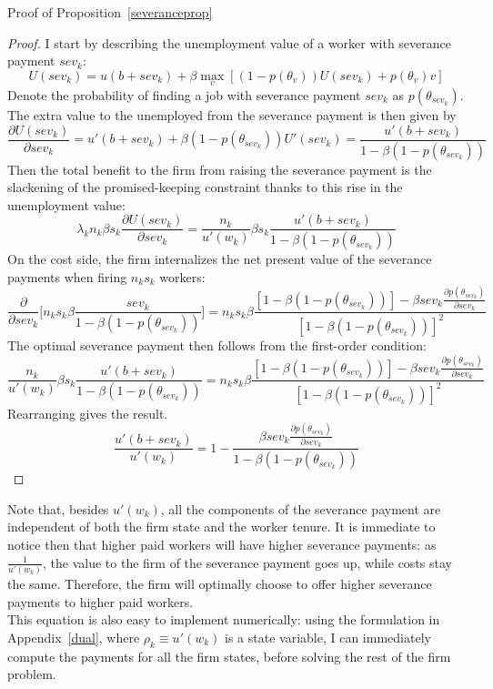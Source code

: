 Proof of Proposition~\ref{severanceprop}
\begin{proof}
\label{proof:severance}
I start by describing the unemployment value of a worker with severance payment $sev_k$:
\[U(sev_k) = u(b+sev_k) + \beta \max_v[(1-p(\theta_v))U(sev_k)+p(\theta_v)v]\]
Denote the probability of finding a job with severance payment $sev_k$ as $p(\theta_{sev_k})$. The extra value to the unemployed from the severance payment is then given by
\[\frac{\partial U(sev_k)}{\partial sev_k} = u'(b+sev_k) + \beta (1-p(\theta_{sev_k}))U'(sev_k)=\frac{u'(b+sev_k)}{1-\beta(1-p(\theta_{sev_k}))}\]
Then the total benefit to the firm from raising the severance payment is the slackening of the promised-keeping constraint thanks to this rise in the unemployment value:
\[\lambda_k n_k \beta s_k \frac{\partial U(sev_k)}{\partial sev_k} = \frac{n_k}{u'(w_k)}\beta s_k \frac{u'(b+sev_k)}{1-\beta(1-p(\theta_{sev_k}))}\]
On the cost side, the firm internalizes the net present value of the severance payments when firing $n_ks_k$ workers:
\[\frac{\partial}{\partial sev_k}\Big[n_k s_k \beta \frac{sev_k}{1-\beta(1-p(\theta_{sev_k}))}\Big]=n_ks_k\beta \frac{[1-\beta(1-p(\theta_{sev_k}))]-\beta sev_k \frac{\partial p(\theta_{sev_k})}{\partial sev_k}}{[1-\beta(1-p(\theta_{sev_k}))]^2}\]
The optimal severance payment then follows from the first-order condition:
\[ \frac{n_k}{u'(w_k)}\beta s_k \frac{u'(b+sev_k)}{1-\beta(1-p(\theta_{sev_k}))} = n_ks_k\beta \frac{[1-\beta(1-p(\theta_{sev_k}))]-\beta sev_k \frac{\partial p(\theta_{sev_k})}{\partial sev_k}}{[1-\beta(1-p(\theta_{sev_k}))]^2}\]
Rearranging gives the result.
\[\frac{u'(b+sev_k)}{u'(w_k)}=1-\frac{\beta sev_k \frac{\partial p(\theta_{sev_k})}{\partial sev_k}}{1-\beta(1-p(\theta_{sev_k}))}\]
\end{proof}
Note that, besides $u'(w_k)$, all the components of the severance payment are independent of both the firm state and the worker tenure. 
It is immediate to notice then that higher paid workers will have higher severance payments: as $\frac{1}{u'(w_k)}$, the value to the firm of the severance payment goes up, while costs stay the same. Therefore, the firm will optimally choose to offer higher severance payments to higher paid workers. \\
This equation is also easy to implement numerically: using the formulation in Appendix~\ref{dual}, where $\rho_k\equiv u'(w_k)$ is a state variable, I can immediately compute the payments for all the firm states, before solving the rest of the firm problem.


